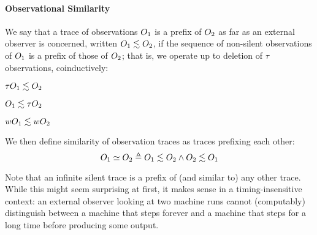 \documentclass[acmsmall,review,anonymous]{acmart}\settopmatter{printfolios=true,printccs=false,printacmref=false}
\begin{document}
\paragraph*{Observational Similarity}

We say that a trace of observations $O_1$ is a prefix of $O_2$
as far as an external observer is concerned, written \(O_1 \lesssim
O_2\), if the sequence of
non-silent observations of $O_1$ is a prefix of those of
$O_2$; that is, we operate up to deletion of \(\tau\) observations,
coinductively:

\begin{minipage}{.3\textwidth}
  \judgment{}{\(\obsT \lesssim \obsT\)}
\end{minipage}
\begin{minipage}{.3\textwidth}
\judgment{}{\(\tau \lesssim \obsT\)}
\end{minipage}
\begin{minipage}{.3\textwidth}
\end{minipage}

\begin{minipage}{.3\textwidth}
         {\(\tau O_1 \lesssim O_2\)}
\end{minipage}
\begin{minipage}{.3\textwidth}
         {\(O_1 \lesssim \tau O_2\)}
\end{minipage}
\begin{minipage}{.3\textwidth}
         {\(wO_1 \lesssim wO_2\)}
\end{minipage}

\smallskip
We then define similarity of observation traces as traces prefixing each other:
\[O_1 \simeq O_2 \triangleq O_1 \lesssim O_2 \land O_2 \lesssim O_1\]
%

Note that an infinite silent trace is a
prefix of (and similar to) any other trace. While this might seem
surprising at first, it makes sense in a timing-insensitive context:
an external observer looking at two machine runs cannot (computably)
distinguish between a machine that steps forever and a machine that
steps for a long time before producing some output.
\end{document}
